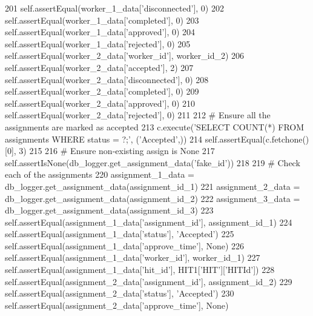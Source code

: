 \begin{DoxyCode}
201         self.assertEqual(worker\_1\_data[\textcolor{stringliteral}{'disconnected'}], 0)
202         self.assertEqual(worker\_1\_data[\textcolor{stringliteral}{'completed'}], 0)
203         self.assertEqual(worker\_1\_data[\textcolor{stringliteral}{'approved'}], 0)
204         self.assertEqual(worker\_1\_data[\textcolor{stringliteral}{'rejected'}], 0)
205         self.assertEqual(worker\_2\_data[\textcolor{stringliteral}{'worker\_id'}], worker\_id\_2)
206         self.assertEqual(worker\_2\_data[\textcolor{stringliteral}{'accepted'}], 2)
207         self.assertEqual(worker\_2\_data[\textcolor{stringliteral}{'disconnected'}], 0)
208         self.assertEqual(worker\_2\_data[\textcolor{stringliteral}{'completed'}], 0)
209         self.assertEqual(worker\_2\_data[\textcolor{stringliteral}{'approved'}], 0)
210         self.assertEqual(worker\_2\_data[\textcolor{stringliteral}{'rejected'}], 0)
211 
212         \textcolor{comment}{# Ensure all the assignments are marked as accepted}
213         c.execute(\textcolor{stringliteral}{'SELECT COUNT(*) FROM assignments WHERE status = ?;'}, (\textcolor{stringliteral}{'Accepted'},))
214         self.assertEqual(c.fetchone()[0], 3)
215 
216         \textcolor{comment}{# Ensure non-existing assign is None}
217         self.assertIsNone(db\_logger.get\_assignment\_data(\textcolor{stringliteral}{'fake\_id'}))
218 
219         \textcolor{comment}{# Check each of the assignments}
220         assignment\_1\_data = db\_logger.get\_assignment\_data(assignment\_id\_1)
221         assignment\_2\_data = db\_logger.get\_assignment\_data(assignment\_id\_2)
222         assignment\_3\_data = db\_logger.get\_assignment\_data(assignment\_id\_3)
223         self.assertEqual(assignment\_1\_data[\textcolor{stringliteral}{'assignment\_id'}], assignment\_id\_1)
224         self.assertEqual(assignment\_1\_data[\textcolor{stringliteral}{'status'}], \textcolor{stringliteral}{'Accepted'})
225         self.assertEqual(assignment\_1\_data[\textcolor{stringliteral}{'approve\_time'}], \textcolor{keywordtype}{None})
226         self.assertEqual(assignment\_1\_data[\textcolor{stringliteral}{'worker\_id'}], worker\_id\_1)
227         self.assertEqual(assignment\_1\_data[\textcolor{stringliteral}{'hit\_id'}], HIT1[\textcolor{stringliteral}{'HIT'}][\textcolor{stringliteral}{'HITId'}])
228         self.assertEqual(assignment\_2\_data[\textcolor{stringliteral}{'assignment\_id'}], assignment\_id\_2)
229         self.assertEqual(assignment\_2\_data[\textcolor{stringliteral}{'status'}], \textcolor{stringliteral}{'Accepted'})
230         self.assertEqual(assignment\_2\_data[\textcolor{stringliteral}{'approve\_time'}], \textcolor{keywordtype}{None})

\end{DoxyCode}
